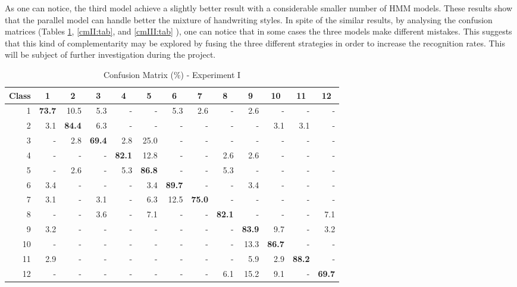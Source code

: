 \documentclass{article}[14pt, oneside, a4paper, times]
\begin{document}
As one can notice, the third model achieve a slightly better result with a considerable smaller number of HMM models. These results show that the parallel model can handle better the mixture of handwriting styles. In spite of the similar results, by analysing the confusion matrices (Tables \ref{cmI:tab}, \ref{cmII:tab}, and \ref{cmIII:tab} ), one can notice that in some cases the three models make different mistakes. This suggests that this kind of complementarity may be explored by fusing the three different strategies in order to increase the recognition rates. This will be subject of further investigation during the project.

\begin{table} [ht!]
\caption {Confusion Matrix (\%) - Experiment I}
\begin{center}
\begin{tabular}{rrrrrrrrrrrrr} \hline 
 \multicolumn{1}{c}{Class}&
 \multicolumn{1}{c}{1}&
 \multicolumn{1}{c}{2}&
 \multicolumn{1}{c}{3}&
 \multicolumn{1}{c}{4}&
 \multicolumn{1}{c}{5}&
 \multicolumn{1}{c}{6}&
 \multicolumn{1}{c}{7}&
 \multicolumn{1}{c}{8}&
 \multicolumn{1}{c}{9}&
 \multicolumn{1}{c}{10}&
 \multicolumn{1}{c}{11}&
 \multicolumn{1}{c}{12} \\ \hline


1 &	 \textbf{73.7} &	 10.5 	& 5.3 	& -   	& -   	& 5.3 	& 2.6 	& -   	& 2.6 	& -   	& -   	& -   \\
2 &	 3.1 &	 \textbf{84.4} 	& 6.3 	& -   	& -   	& -   	& -   	& -   	& -   	& 3.1 	& 3.1 	& -   \\
3 &	 -   &	 2.8 	& \textbf{69.4} 	& 2.8 	& 25.0 	& -   	& -   	& -   	& -   	& -   	& -   	& -   \\
4 &	 -  & 	 -   	& -   	& \textbf{82.1} 	& 12.8 	& -   	& -   	& 2.6 	& 2.6 	& -   	& -   	& -   \\
5 &	 -   &	 2.6 	& -   	& 5.3 	& \textbf{86.8} 	& -   	& -   	& 5.3 	& -   	& -   	& -   	& -   \\
6 &	 3.4 &	 -   	& -   	& -   	& 3.4 	& \textbf{89.7} 	& -   	& -   	& 3.4 	& -   	& -   	& -   \\
7 &	 3.1 &	 -   	& 3.1 	& -   	& 6.3 	& 12.5 	& \textbf{75.0} 	& -   	& -   	& -   	& -   	& -   \\
8 &	 -   &	 -   	& 3.6 	& -   	& 7.1 	& -   	& -   	& \textbf{82.1} 	& -   	& -   	& -   	& 7.1 \\
9 &	 3.2 &	 -   	& -   	& -   	& -   	& -   	& -   	& -   	& \textbf{83.9} 	& 9.7 	& -   	& 3.2 \\
10&	 -   &	 -   	& -   	& -   	& -   	& -   	& -   	& -   	& 13.3 	& \textbf{86.7} 	& -   	& -   \\
11&	 2.9 &	 -   	& -   	& -   	& -   	& -   	& -   	& -   	& 5.9 	& 2.9 	& \textbf{88.2} 	& -  \\ 
12&	 -   &	 -   	& -   	& -   	& -   	& -   	& -   	& 6.1 	& 15.2 	& 9.1 	& -   	& \textbf{69.7}\\ \hline 

\end{tabular}
\label{cmI:tab}
\end{center}
\end{table}
\end{document}
